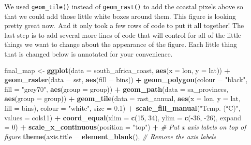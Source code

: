 \documentclass[
]{book}
\newenvironment{Shaded}{\begin{snugshade}}{\end{snugshade}}
\newcommand{\CommentTok}[1]{\textcolor[rgb]{0.56,0.35,0.01}{\textit{#1}}}
\newcommand{\DataTypeTok}[1]{\textcolor[rgb]{0.13,0.29,0.53}{#1}}
\newcommand{\DecValTok}[1]{\textcolor[rgb]{0.00,0.00,0.81}{#1}}
\newcommand{\FloatTok}[1]{\textcolor[rgb]{0.00,0.00,0.81}{#1}}
\newcommand{\KeywordTok}[1]{\textcolor[rgb]{0.13,0.29,0.53}{\textbf{#1}}}
\newcommand{\NormalTok}[1]{#1}
\newcommand{\OperatorTok}[1]{\textcolor[rgb]{0.81,0.36,0.00}{\textbf{#1}}}
\newcommand{\StringTok}[1]{\textcolor[rgb]{0.31,0.60,0.02}{#1}}
\begin{document}
We used \texttt{geom\_tile()} instead of \texttt{geom\_rast()} to add the coastal pixels above so that we could add those little white boxes around them. This figure is looking pretty great now. And it only took a few rows of code to put it all together! The last step is to add several more lines of code that will control for all of the little things we want to change about the appearance of the figure. Each little thing that is changed below is annotated for your convenience.

\begin{Shaded}
\begin{Highlighting}[]
\NormalTok{final\_map <{-}}\StringTok{ }\KeywordTok{ggplot}\NormalTok{(}\DataTypeTok{data =}\NormalTok{ south\_africa\_coast, }\KeywordTok{aes}\NormalTok{(}\DataTypeTok{x =}\NormalTok{ lon, }\DataTypeTok{y =}\NormalTok{ lat)) }\OperatorTok{+}
\StringTok{  }\KeywordTok{geom\_raster}\NormalTok{(}\DataTypeTok{data =}\NormalTok{ sst, }\KeywordTok{aes}\NormalTok{(}\DataTypeTok{fill =}\NormalTok{ bins)) }\OperatorTok{+}
\StringTok{  }\KeywordTok{geom\_polygon}\NormalTok{(}\DataTypeTok{colour =} \StringTok{"black"}\NormalTok{, }\DataTypeTok{fill =} \StringTok{"grey70"}\NormalTok{, }\KeywordTok{aes}\NormalTok{(}\DataTypeTok{group =}\NormalTok{ group)) }\OperatorTok{+}
\StringTok{  }\KeywordTok{geom\_path}\NormalTok{(}\DataTypeTok{data =}\NormalTok{ sa\_provinces, }\KeywordTok{aes}\NormalTok{(}\DataTypeTok{group =}\NormalTok{ group)) }\OperatorTok{+}
\StringTok{  }\KeywordTok{geom\_tile}\NormalTok{(}\DataTypeTok{data =}\NormalTok{ rast\_annual, }\KeywordTok{aes}\NormalTok{(}\DataTypeTok{x =}\NormalTok{ lon, }\DataTypeTok{y =}\NormalTok{ lat, }\DataTypeTok{fill =}\NormalTok{ bins), }
            \DataTypeTok{colour =} \StringTok{"white"}\NormalTok{, }\DataTypeTok{size =} \FloatTok{0.1}\NormalTok{) }\OperatorTok{+}
\StringTok{  }\KeywordTok{scale\_fill\_manual}\NormalTok{(}\StringTok{"Temp. (°C)"}\NormalTok{, }\DataTypeTok{values =}\NormalTok{ cols11) }\OperatorTok{+}
\StringTok{  }\KeywordTok{coord\_equal}\NormalTok{(}\DataTypeTok{xlim =} \KeywordTok{c}\NormalTok{(}\DecValTok{15}\NormalTok{, }\DecValTok{34}\NormalTok{), }\DataTypeTok{ylim =} \KeywordTok{c}\NormalTok{(}\OperatorTok{{-}}\DecValTok{36}\NormalTok{, }\DecValTok{{-}26}\NormalTok{), }\DataTypeTok{expand =} \DecValTok{0}\NormalTok{) }\OperatorTok{+}
\StringTok{  }\KeywordTok{scale\_x\_continuous}\NormalTok{(}\DataTypeTok{position =} \StringTok{"top"}\NormalTok{) }\OperatorTok{+}\StringTok{ }\CommentTok{\# Put x axis labels on top of figure}
\StringTok{  }\KeywordTok{theme}\NormalTok{(}\DataTypeTok{axis.title =} \KeywordTok{element\_blank}\NormalTok{(), }\CommentTok{\# Remove the axis labels}

\end{Highlighting}
\end{Shaded}
\end{document}
